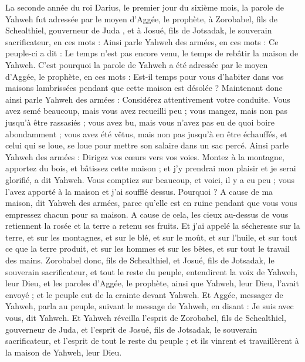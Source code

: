 \begin{multicols}{2}
\VerseOne{}La seconde année du roi Darius, le premier jour du sixième mois, la parole de Yahweh fut adressée par le moyen d'Aggée, le prophète, à Zorobabel, fils de Schealthiel, gouverneur de Juda , et à Josué, fils de Jotsadak, le souverain sacrificateur, en ces mots :
Ainsi parle Yahweh des armées, en ces mots : Ce peuple-ci a dit : Le temps n'est pas encore venu, le temps de rebâtir la maison de Yahweh.
C'est pourquoi la parole de Yahweh a été adressée par le moyen d'Aggée, le prophète, en ces mots :
Est-il temps pour vous d'habiter dans vos maisons lambrissées pendant que cette maison est désolée ?
Maintenant donc ainsi parle Yahweh des armées : Considérez attentivement votre conduite.
Vous avez semé beaucoup, mais vous avez recueilli peu ; vous mangez, mais non pas jusqu'à être rassasiés ; vous avez bu, mais vous n'avez pas eu de quoi boire abondamment ; vous avez été vêtus, mais non pas jusqu'à en être échauffés, et celui qui se loue, se loue pour mettre son salaire dans un sac percé.
Ainsi parle Yahweh des armées : Dirigez vos cœurs vers vos voies.
Montez à la montagne, apportez du bois, et bâtissez cette maison ; et j'y prendrai mon plaisir et je serai glorifié, a dit Yahweh.
Vous comptiez sur beaucoup, et voici, il y a eu peu ; vous l'avez apporté à la maison et j'ai soufflé dessus. Pourquoi ? A cause de ma maison, dit Yahweh des armées, parce qu'elle est en ruine pendant que vous vous empressez chacun pour sa maison.
A cause de cela, les cieux au-dessus de vous retiennent la rosée et la terre a retenu ses fruits.
Et j'ai appelé la sécheresse sur la terre, et sur les montagnes, et sur le blé, et sur le moût, et sur l'huile, et sur tout ce que la terre produit, et sur les hommes et sur les bêtes, et sur tout le travail des mains.
Zorobabel donc, fils de Schealthiel, et Josué, fils de Jotsadak, le souverain sacrificateur, et tout le reste du peuple, entendirent la voix de Yahweh, leur Dieu, et les paroles d'Aggée, le prophète, ainsi que Yahweh, leur Dieu, l'avait envoyé ; et le peuple eut de la crainte devant Yahweh.
Et Aggée, messager de Yahweh, parla au peuple, suivant le message de Yahweh, en disant : Je suis avec vous, dit Yahweh.
Et Yahweh réveilla l'esprit de Zorobabel, fils de Schealthiel, gouverneur de Juda, et l'esprit de Josué, fils de Jotsadak, le souverain sacrificateur, et l'esprit de tout le reste du peuple ; et ils vinrent et travaillèrent à la maison de Yahweh, leur Dieu.

\end{multicols}
